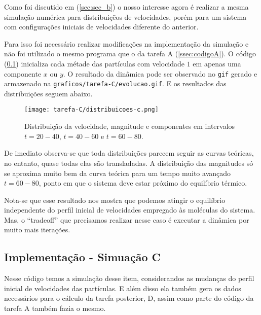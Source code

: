 Como foi discutido em (\ref{sec:sec_b}) o nosso interesse agora é realizar a mesma simulação numérica 
para distribuiçẽos de velocidades, porém para um sistema com configurações iniciais de velocidades 
diferente do anterior. 

Para isso foi necessário realizar modificações na implementação da simulação e não foi utilizado o mesmo 
programa que o da tarefa A (\ref{ssec:codigoA}). O código (\ref{ssec:codigoC}) inicializa cada métade 
das partículas com velocidade $1$ em apenas uma componente $x$ ou $y$. 
O resultado da dinâmica pode ser observado no \verb|gif| gerado e armazenado na  \verb|graficos/tarefa-C/evolucao.gif|. E 
os resultados das distribuições seguem abaixo.

\begin{figure}[h!]
    \centering
    \texttt{[image: tarefa-C/distribuicoes-c.png]}
    \caption{Distribuição da velocidade, magnitude e componentes em intervalos $t=20-40$, $t=40-60$ e $t=60-80$.}
    \label{fig:distribuicoes-velocidade-c}
\end{figure}


De imediato observa-se que toda distribuições parecem seguir as curvas teóricas, no entanto, quase todas 
elas são transladadas. A distribuição das magnitudes só se aproxima muito bem da curva teórica para um tempo muito avançado $t=60-80$, ponto em que o sistema deve estar 
próximo do equilíbrio térmico.


Nota-se que esse resultado nos mostra que podemos atingir o equilíbrio independente do perfil inicial de 
velocidades empregado às moléculas do sistema. Mas, o ``tradeoff'' que precisamos realizar nesse caso é 
executar a dinâmica por muito mais iterações. 

\subsection{Implementação - Simuação C}
\label{ssec:codigoC}
Nesse código temos a simulação desse item, considerandos as mudanças do perfil inicial de velocidades 
das partículas. E além disso ela também gera os dados necessários para o cálculo da tarefa posterior, D, assim 
como parte do código da tarefa A também fazia o mesmo.

\clearpage